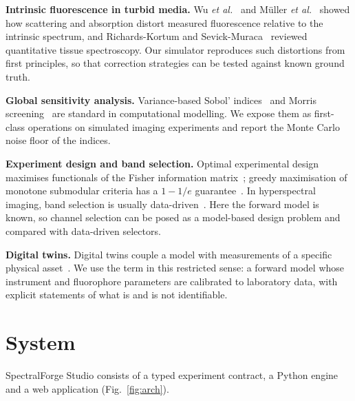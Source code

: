 \documentclass[journal]{IEEEtran}
\begin{document}
\textbf{Intrinsic fluorescence in turbid media.} Wu \emph{et al.}~\cite{wu1993} and M\"uller \emph{et al.}~\cite{muller2001} showed how scattering and absorption distort measured fluorescence relative to the intrinsic spectrum, and Richards-Kortum and Sevick-Muraca~\cite{richards1996} reviewed quantitative tissue spectroscopy. Our simulator reproduces such distortions from first principles, so that correction strategies can be tested against known ground truth.

\textbf{Global sensitivity analysis.} Variance-based Sobol' indices~\cite{sobol2001,saltelli2010,jansen1999} and Morris screening~\cite{morris1991,campolongo2007} are standard in computational modelling. We expose them as first-class operations on simulated imaging experiments and report the Monte Carlo noise floor of the indices.

\textbf{Experiment design and band selection.} Optimal experimental design maximises functionals of the Fisher information matrix~\cite{pukelsheim2006}; greedy maximisation of monotone submodular criteria has a $1-1/e$ guarantee~\cite{nemhauser1978}. In hyperspectral imaging, band selection is usually data-driven~\cite{chang1999,sun2019bandselection,cai2020bsnets,meloyan2025scirep}. Here the forward model is known, so channel selection can be posed as a model-based design problem and compared with data-driven selectors.

\textbf{Digital twins.} Digital twins couple a model with measurements of a specific physical asset~\cite{rasheed2020,katsoulakis2024}. We use the term in this restricted sense: a forward model whose instrument and fluorophore parameters are calibrated to laboratory data, with explicit statements of what is and is not identifiable.

\section{System}
\label{sec:system}
SpectralForge Studio consists of a typed experiment contract, a Python engine and a web application (Fig.~\ref{fig:arch}).
\end{document}
